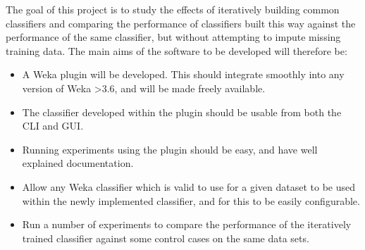 
The goal of this project is to study the effects of iteratively building common classifiers and comparing the performance of classifiers built this way against the performance of the same classifier, but without attempting to impute missing training data. The main aims of the software to be developed will therefore be:

\begin{itemize}
\item A Weka plugin will be developed. This should integrate smoothly into any version of Weka \textgreater  3.6, and will be made freely available. 
\item The classifier developed within the plugin should be usable from both the CLI and GUI.
\item Running experiments using the plugin should be easy, and have well explained documentation.
\item Allow any Weka classifier which is valid to use for a given dataset to be used within the newly implemented classifier, and for this to be easily configurable.
\item Run a number of experiments to compare the performance of the iteratively trained classifier against some control cases on the same data sets.
\end{itemize}
